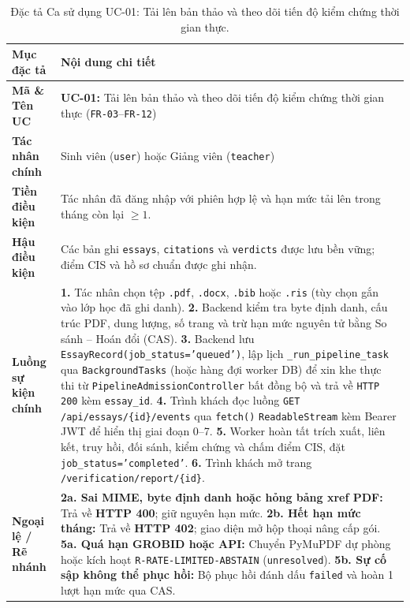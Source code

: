 \begin{table}[!htbp]
\centering
\renewcommand{\arraystretch}{0.98}
\caption{Đặc tả Ca sử dụng UC-01: Tải lên bản thảo và theo dõi tiến độ kiểm chứng thời gian thực.}\label{tab:uc01}
\begin{tabular}{|L{0.24}|L{0.76}|}
\hline
\textbf{Mục đặc tả} & \textbf{Nội dung chi tiết} \\
\hline
\textbf{Mã \& Tên UC} & \textbf{UC-01:} Tải lên bản thảo và theo dõi tiến độ kiểm chứng thời gian thực (\texttt{FR-03}--\texttt{FR-12}) \\
\hline
\textbf{Tác nhân chính} & Sinh viên (\texttt{user}) hoặc Giảng viên (\texttt{teacher}) \\
\hline
\textbf{Tiền điều kiện} & Tác nhân đã đăng nhập với phiên hợp lệ và hạn mức tải lên trong tháng còn lại $\ge 1$. \\
\hline
\textbf{Hậu điều kiện} & Các bản ghi \texttt{essays}, \texttt{citations} và \texttt{verdicts} được lưu bền vững; điểm CIS và hồ sơ chuẩn được ghi nhận. \\
\hline
\textbf{Luồng sự kiện chính} & \textbf{1.} Tác nhân chọn tệp \texttt{.pdf}, \texttt{.docx}, \texttt{.bib} hoặc \texttt{.ris} (tùy chọn gắn vào lớp học đã ghi danh). \newline \textbf{2.} Backend kiểm tra byte định danh, cấu trúc PDF, dung lượng, số trang và trừ hạn mức nguyên tử bằng So sánh -- Hoán đổi (CAS). \newline \textbf{3.} Backend lưu \texttt{EssayRecord(job\_status='queued')}, lập lịch \texttt{\_run\_pipeline\_task} qua \texttt{BackgroundTasks} (hoặc hàng đợi worker DB) để xin khe thực thi từ \texttt{PipelineAdmissionController} bất đồng bộ và trả về \texttt{HTTP 200} kèm \texttt{essay\_id}. \newline \textbf{4.} Trình khách đọc luồng \texttt{GET /api/essays/\{id\}/events} qua \texttt{fetch()} \texttt{ReadableStream} kèm Bearer JWT để hiển thị giai đoạn 0--7. \newline \textbf{5.} Worker hoàn tất trích xuất, liên kết, truy hồi, đối sánh, kiểm chứng và chấm điểm CIS, đặt \texttt{job\_status='completed'}. \newline \textbf{6.} Trình khách mở trang \texttt{/verification/report/\{id\}}. \\
\hline
\textbf{Ngoại lệ / Rẽ nhánh} & \textbf{2a. Sai MIME, byte định danh hoặc hỏng bảng xref PDF:} Trả về \textbf{HTTP 400}; giữ nguyên hạn mức. \newline \textbf{2b. Hết hạn mức tháng:} Trả về \textbf{HTTP 402}; giao diện mở hộp thoại nâng cấp gói. \newline \textbf{5a. Quá hạn GROBID hoặc API:} Chuyển PyMuPDF dự phòng hoặc kích hoạt \texttt{R-RATE-LIMITED-ABSTAIN} (\texttt{unresolved}). \newline \textbf{5b. Sự cố sập không thể phục hồi:} Bộ phục hồi đánh dấu \texttt{failed} và hoàn 1 lượt hạn mức qua CAS. \\
\hline
\end{tabular}
\end{table}

